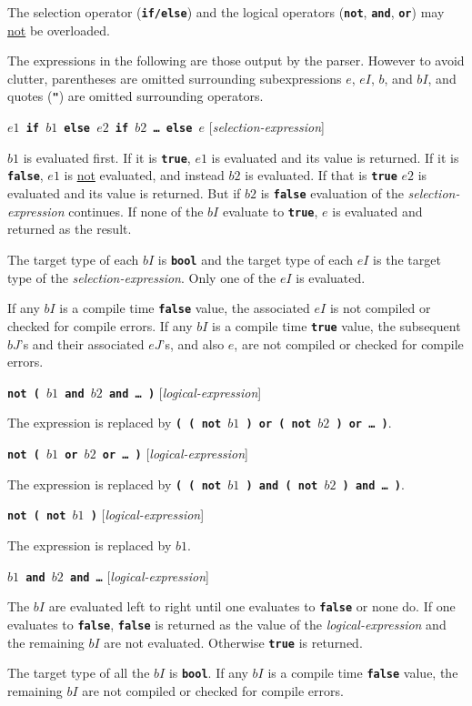\documentclass[12pt]{article}
\newcommand{\TT}[1]{{\tt \bfseries #1}}
\newenvironment{indpar}[1][0.3in]%
	{\begin{list}{}%
		     {\setlength{\itemsep}{0in}%
		      \setlength{\topsep}{0in}%
		      \setlength{\parsep}{1ex}%
		      \setlength{\labelwidth}{#1}%
		      \setlength{\leftmargin}{#1}%
		      \addtolength{\leftmargin}{\labelsep}}%
	 \item}%
	{\end{list}}
\begin{document}
The selection operator (\TT{if/else}) and the logical
operators (\TT{not}, \TT{and}, \TT{or}) may \underline{not}
be overloaded.

The expressions in the following are those output by the parser.
However to avoid clutter, parentheses are omitted surrounding
subexpressions $e$, $eI$, $b$, and $bI$, and quotes (\TT{"}) are omitted
surrounding operators.

\medskip

\TT{$e1$ if $b1$ else $e2$ if $b2$ \ldots{} else $e$}
\hfill [{\em selection-expression}]
\begin{indpar}
$b1$ is evaluated first.  If it is \TT{true}, $e1$ is evaluated and its
value is returned.  If it is \TT{false}, $e1$ is \underline{not}
evaluated, and instead $b2$ is evaluated.  If that is \TT{true}
$e2$ is evaluated and its value is returned.  But if $b2$ is \TT{false}
evaluation of the {\em selection-expression} continues.  If none of
the $bI$ evaluate to \TT{true}, $e$ is evaluated and returned as the result.

The target type of each $bI$ is \TT{bool} and the target type of each
$eI$ is the target type of the {\em selection-expression}.
Only one of the $eI$ is evaluated.

If any $bI$ is a compile time
\TT{false} value, the associated $eI$ is not compiled or checked
for compile errors.
If any $bI$ is a compile time
\TT{true} value, the subsequent $bJ$'s and their associated $eJ$'s,
and also $e$,
are not compiled or checked
for compile errors.
\end{indpar}

\TT{not ( $b1$ and $b2$ and \ldots{} )}
\hfill [{\em logical-expression}]
\begin{indpar}
The expression is replaced by
\TT{( ( not $b1$ ) or ( not $b2$ ) or \ldots{} )}.
\end{indpar}

\TT{not ( $b1$ or $b2$ or \ldots{} )}
\hfill [{\em logical-expression}]
\begin{indpar}
The expression is replaced by
\TT{( ( not $b1$ ) and ( not $b2$ ) and \ldots{} )}.
\end{indpar}

\TT{not ( not $b1$ )}
\hfill [{\em logical-expression}]
\begin{indpar}
The expression is replaced by $b1$.
\end{indpar}

\TT{$b1$ and $b2$ and \ldots{}}
\hfill [{\em logical-expression}]
\begin{indpar}
The $bI$ are evaluated left to right until one evaluates to
\TT{false} or none do.  If one evaluates to \TT{false},
\TT{false} is returned as the value of the {\em logical-expression}
and the remaining $bI$ are not evaluated.
Otherwise \TT{true} is returned.

The target type of all the $bI$ is \TT{bool}.  If any $bI$ is a
compile time \TT{false} value, the remaining $bI$ are not compiled
or checked for compile errors.
\end{indpar}
\end{document}
